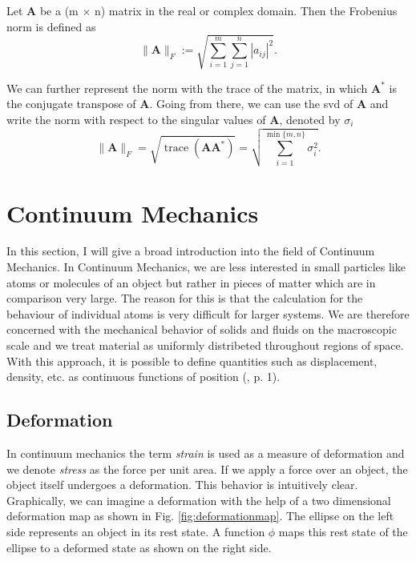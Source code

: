 \begin{definition}
\label{FN}
Let \textbf{A} be a (m $\times$ n) matrix in the real or complex domain. Then the Frobenius norm is defined as 
\[
\| \mathbf{A} \|_{F} := \sqrt{\sum\limits_{i=1}^{m} \sum\limits_{j=1}^{n} |a_{ij}|^2}.
\]
\end{definition}

We can further represent the norm with the trace of the matrix, in which $\mathbf{A}^*$ is the conjugate transpose of \textbf{A}. Going from there, we can use the \acrshort{svd} of \textbf{A} and write the norm with respect to the singular values of \textbf{A}, denoted by $\sigma_i$
\begin{equation} \label{eq:FN}
\| \mathbf{A} \|_{F} = \sqrt{\operatorname{trace}(\mathbf{A} \mathbf{A}^*)} = \sqrt{\sum\limits_{i=1}^{\operatorname{min}\{m,n\}} \sigma_i^2}.
\end{equation}


\section{Continuum Mechanics}
In this section, I will give a broad introduction into the field of Continuum Mechanics. In Continuum Mechanics, we are less interested in small particles like atoms or molecules of an object but rather in pieces of matter which are in comparison very large. The reason for this is that the calculation for the behaviour of individual atoms is very difficult for larger systems. We are therefore concerned with the mechanical behavior of solids and fluids on the macroscopic scale and we treat material as uniformly distribeted throughout regions of space. With this approach, it is possible to define quantities such as displacement, density, etc. as continuous functions of position (\cite{Spencer1980}, p. 1).


\subsection{Deformation}
In continuum mechanics the term \textit{strain} is used as a measure of deformation and we denote \textit{stress} as the force per unit area. If we apply a force over an object, the object itself undergoes a deformation. This behavior is intuitively clear. Graphically, we can imagine a deformation with the help of a two dimensional deformation map as shown in Fig. \ref{fig:deformationmap}. The ellipse on the left side represents an object in its rest state. A function $\phi$ maps this rest state of the ellipse to a deformed state as shown on the right side.

